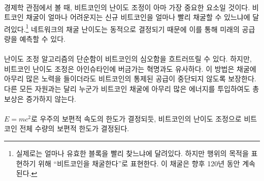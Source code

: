 \paragraph{}
\begin{comment}	
	Viewed through the lens of economics, Bitcoin's \textit{difficulty adjustment}
	is probably its most important component. How hard it is to mine bitcoin depends
	on how quickly new bitcoins are mined.\footnote{It actually depends on how
		quickly valid blocks are found, but for our purposes, this is the same thing as
		\enquote{mining bitcoins} and will be so for the next 120 years.} It is the dynamic
	adjustment of the network's mining difficulty which enables us to predict its
	future supply.
\end{comment}
경제학 관점에서 볼 때, 비트코인의 난이도 조정이 아마 가장 중요한 요소일 것이다.
비트코인 채굴이 얼마나 어려운지는 신규 비트코인을 얼마나 빨리 채굴할 수 있느냐에 달려있다.\footnote{실제로는 얼마나 유효한 블록을 빨리 찾느냐에 달려있다. 
	하지만 행위의 목적을 표현하기 위해 \enquote{비트코인을 채굴한다}로 표현한다. 
	이 채굴은 향후 120년 동안 계속된다.}
네트워크의 채굴 난이도는 동적으로 결정되기 때문에 이를 통해 미래의 공급량을 예측할 수 있다.

\paragraph{}
\begin{comment}	
	The simplicity of the difficulty adjustment algorithm might distract
	from its profundity, but the difficulty adjustment truly is a revolution
	of Einsteinian proportions. It ensures that, no matter how much or how
	little effort is spent on mining, Bitcoin's controlled supply won't be
	disrupted. As opposed to every other resource, no matter how much
	energy someone will put into mining bitcoin, the total reward will not
	increase.
\end{comment}
난이도 조정 알고리즘의 단순함이 비트코인의 심오함을 흐트러뜨릴 수 있다. 
하지만, 비트코인 난이도 조정은 아인슈타인에 버금가는 혁명과도 유사하다.
이 방법은 채굴에 아무리 많은 노력을 들이더라도 비트코인의 통제된 공급이 중단되지 않도록 보장한다.
다른 모든 자원과는 달리 누군가 비트코인 채굴에 아무리 많은 에너지를 투입하여도 총 보상은 증가하지 않는다.

\paragraph{}
\begin{comment}	
	Just like $E=mc^2$ dictates the universal speed limit in our universe,
	Bitcoin's difficulty adjustment dictates the \textbf{universal money limit}
	in Bitcoin.
\end{comment}
$E=mc^2$로 우주의 보편적 속도의 한도가 결정되듯, 
비트코인의 난이도 조정으로 비트코인 전체 수량의 보편적 한도가 결정된다.

